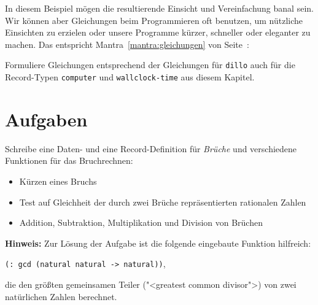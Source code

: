 In diesem Beispiel mögen die
resultierende Einsicht und Vereinfachung banal sein.  Wir können aber
Gleichungen beim Programmieren oft benutzen, um nützliche Einsichten zu erzielen oder
unsere Programme kürzer, schneller oder eleganter zu machen.  Das
entspricht Mantra~\ref{mantra:gleichungen} von
Seite~\pageref{mantra:gleichungen}:
%
\mantragleichungen*

\begin{aufgabeinline}
  Formuliere Gleichungen entsprechend der Gleichungen für
  \lstinline{dillo} auch für die
  Record-Typen \lstinline{computer} und \lstinline{wallclock-time} aus
  diesem Kapitel.
\end{aufgabeinline}

\section*{Aufgaben}

\begin{aufgabe}
  Schreibe eine Daten- und eine
  Record-Definition für \textit{Brüche} und verschiedene Funktionen
  für das Bruchrechnen:
  \begin{itemize}
  \item Kürzen eines Bruchs
  \item Test auf Gleichheit der durch zwei Brüche repräsentierten
    rationalen Zahlen
  \item Addition, Subtraktion, Multiplikation und Division von
    Brüchen
  \end{itemize}
  \textbf{Hinweis:} Zur Lösung der Aufgabe ist die folgende eingebaute
  Funktion hilfreich:
  \begin{center}
    \lstinline{(: gcd (natural natural -> natural))},
  \end{center}
  die den größten gemeinsamen Teiler ("<greatest common divisor">) von
  zwei natürlichen Zahlen berechnet.

\end{aufgabe}

